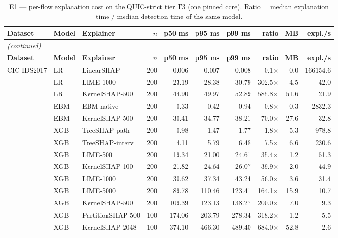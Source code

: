 \begingroup
\scriptsize
\setlength{\tabcolsep}{2.5pt}
\begin{longtable}{lllrrrrrrr}
\caption{E1 --- per-flow explanation cost on the QUIC-strict tier T3 (one pinned core). Ratio = median explanation time / median detection time of the same model.}\label{tab:costfull} \\
\toprule
\textbf{Dataset} & \textbf{Model} & \textbf{Explainer} & \textbf{$n$} & \textbf{p50 ms} & \textbf{p95 ms} & \textbf{p99 ms} & \textbf{ratio} & \textbf{MB} & \textbf{expl./s} \\
\midrule
\endfirsthead
\multicolumn{10}{l}{\textit{(continued)}} \\
\toprule
\textbf{Dataset} & \textbf{Model} & \textbf{Explainer} & \textbf{$n$} & \textbf{p50 ms} & \textbf{p95 ms} & \textbf{p99 ms} & \textbf{ratio} & \textbf{MB} & \textbf{expl./s} \\
\midrule
\endhead
\bottomrule
\endlastfoot
CIC-IDS2017 & LR & LinearSHAP & 200 & 0.006 & 0.007 & 0.008 & 0.1$\times$ & 0.0 & 166154.6 \\
 & LR & LIME-1000 & 200 & 23.19 & 28.38 & 30.79 & 302.5$\times$ & 4.5 & 42.0 \\
 & LR & KernelSHAP-500 & 200 & 44.90 & 49.97 & 52.89 & 585.8$\times$ & 51.6 & 21.9 \\
 & EBM & EBM-native & 200 & 0.33 & 0.42 & 0.94 & 0.8$\times$ & 0.3 & 2832.3 \\
 & EBM & KernelSHAP-500 & 200 & 30.41 & 34.77 & 38.21 & 70.0$\times$ & 27.6 & 32.8 \\
 & XGB & TreeSHAP-path & 200 & 0.98 & 1.47 & 1.77 & 1.8$\times$ & 5.3 & 978.8 \\
 & XGB & TreeSHAP-interv & 200 & 4.11 & 5.79 & 6.48 & 7.5$\times$ & 6.6 & 230.6 \\
 & XGB & LIME-500 & 200 & 19.34 & 21.00 & 24.61 & 35.4$\times$ & 1.2 & 51.3 \\
 & XGB & KernelSHAP-100 & 200 & 21.82 & 24.64 & 26.07 & 39.9$\times$ & 2.0 & 44.9 \\
 & XGB & LIME-1000 & 200 & 30.62 & 37.34 & 43.24 & 56.0$\times$ & 3.6 & 31.4 \\
 & XGB & LIME-5000 & 200 & 89.78 & 110.46 & 123.41 & 164.1$\times$ & 15.9 & 10.7 \\
 & XGB & KernelSHAP-500 & 200 & 109.39 & 123.13 & 138.27 & 200.0$\times$ & 7.0 & 9.3 \\
 & XGB & PartitionSHAP-500 & 100 & 174.06 & 203.79 & 278.34 & 318.2$\times$ & 1.2 & 5.5 \\
 & XGB & KernelSHAP-2048 & 100 & 374.10 & 466.30 & 489.40 & 684.0$\times$ & 52.8 & 2.6 \\

\end{longtable}

